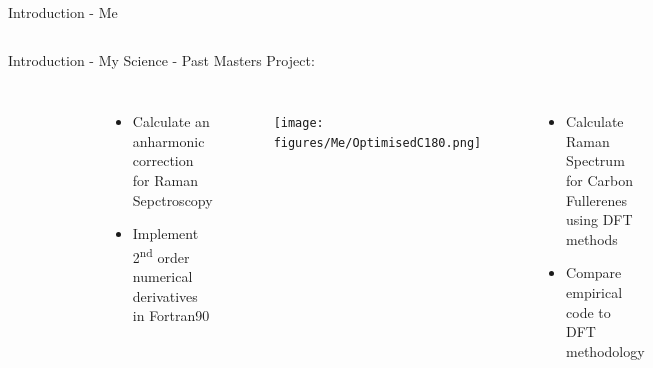 \begin{frame}{Introduction - Me}
\begin{columns}
\end{columns}
\end{frame}

\begin{frame}{Introduction - My Science - Past}
Masters Project:
\begin{columns}
\begin{figure}
\includegraphics[width=0.7\textwidth]{figures/Me/harmonicoscilator}
\end{figure}
\begin{itemize}
	\item Calculate an anharmonic correction for Raman Sepctroscopy
	\item Implement 2\textsuperscript{nd} order numerical derivatives in Fortran90
\end{itemize}

\begin{figure}
\texttt{[image: figures/Me/OptimisedC180.png]}
\end{figure}
\begin{itemize}
	\item Calculate Raman Spectrum for Carbon Fullerenes using DFT methods
	\item Compare empirical code to DFT methodology
\end{itemize}

\end{columns}
\end{frame}

